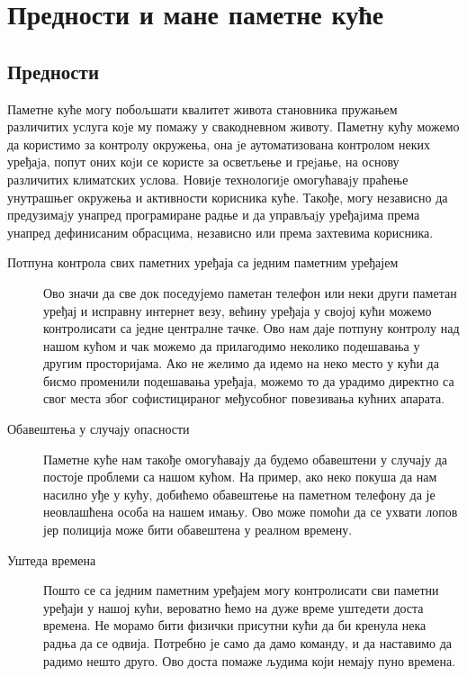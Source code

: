 \documentclass[a4paper]{article}
\begin{document}
\section{Предности и мане паметне куће}

\subsection{Предности}
Паметне куће могу побољшати квалитет живота становника пружањем различитих услуга коjе му помажу у свакодневном животу.\newline\newline
Паметну кућу можемо да користимо за контролу окружења, она jе аутоматизована контролом неких уређаjа, попут оних коjи се
користе за осветљење и греjање, на основу различитих климатских услова. Новиjе технологиjе омогућаваjу праћење унутрашњег
окружења и активности корисника куће. Такође, могу независно да предузимаjу унапред програмиране радње и да управљаjу уређаjима према унапред дефинисаним обрасцима, независно или према захтевима корисника.
\newline\newline
\begin{description}
    \item[Потпуна контрола свих паметних уређаја са једним паметним уређајем]
    Ово значи да све док поседујемо паметан телефон или неки други паметан уређај и исправну интернет везу, већину уређаја у својој кући можемо контролисати са једне централне тачке.
    Ово нам даје потпуну контролу над нашом кућом и чак можемо да прилагодимо неколико подешавања у другим просторијама. Ако не желимо да идемо на неко место
    у кући да бисмо променили подешавања уређаја, можемо то да урадимо директно са свог места због софистицираног међусобног повезивања кућних апарата.
    \item[Обавештења у случају опасности]
    Паметне куће нам такође омогућавају да будемо обавештени у случају да постоје проблеми са нашом кућом. На пример, ако неко покуша да нам насилно уђе у кућу,
    добићемо обавештење на паметном телефону да је неовлашћена особа на нашем имању. Ово може помоћи да се ухвати лопов јер полиција може бити обавештена у реалном времену.
    \item[Уштеда времена]
    Пошто се са једним паметним уређајем могу контролисати сви паметни уређаји у нашој кући, вероватно ћемо на дуже време уштедети доста времена. Не морамо бити
    физички присутни кући да би кренула нека радња да се одвија. Потребно је само да дамо команду, и да наставимо да радимо нешто друго.
    Ово доста помаже људима који немају пуно времена.
\end{description}
\end{document}
